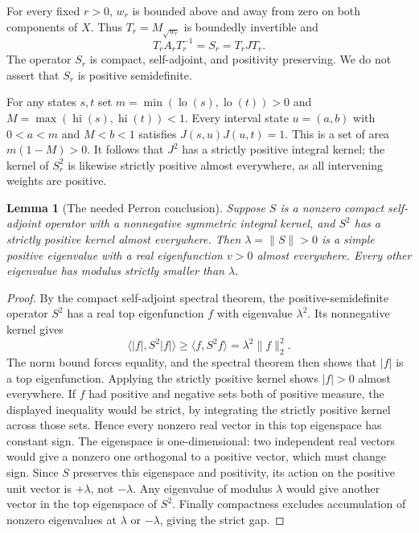 \documentclass[11pt,letterpaper]{article}
\numberwithin{equation}{section}
\newtheorem{lemma}[theorem]{Lemma}
\theoremstyle{remark}\newtheorem{remark}[theorem]{Remark}
\newcommand{\lo}{\operatorname{lo}}
\newcommand{\hi}{\operatorname{hi}}
\begin{document}
For every fixed $r>0$, $w_r$ is bounded above and away from zero on
both components of $X$. Thus $T_r=M_{\sqrt{w_r}}$ is boundedly
invertible and
\begin{equation}\label{psp:op:eq:similarity}
 T_rA_rT_r^{-1}=S_r=T_rJT_r.
\end{equation}
The operator $S_r$ is compact, self-adjoint, and positivity preserving.
We do not assert that $S_r$ is positive semidefinite.

For any states $s,t$ set
$m=\min(\lo(s),\lo(t))>0$ and
$M=\max(\hi(s),\hi(t))<1$. Every interval state
$u=(a,b)$ with $0<a<m$ and $M<b<1$ satisfies
$J(s,u)J(u,t)=1$. This is a set of area $m(1-M)>0$.
It follows that $J^2$ has a strictly positive integral kernel;
the kernel of $S_r^2$ is likewise strictly positive almost everywhere,
as all intervening weights are positive.

\begin{lemma}[The needed Perron conclusion]\label{psp:op:lem:perron}
Suppose $S$ is a nonzero compact self-adjoint operator with a
nonnegative symmetric integral kernel, and $S^2$ has a strictly
positive kernel almost everywhere. Then $\lambda=\|S\|>0$ is a simple
positive eigenvalue with a real eigenfunction $v>0$ almost everywhere.
Every other eigenvalue has modulus strictly smaller than $\lambda$.
\end{lemma}
\begin{proof}
By the compact self-adjoint spectral theorem, the positive-semidefinite
operator $S^2$ has a real top eigenfunction $f$ with eigenvalue
$\lambda^2$. Its nonnegative kernel gives
\[
 \langle |f|,S^2|f|\rangle\geq
 \langle f,S^2f\rangle=\lambda^2\|f\|_2^2.
\]
The norm bound forces equality, and the spectral theorem then shows
that $|f|$ is a top eigenfunction. Applying the strictly positive
kernel shows $|f|>0$ almost everywhere. If $f$ had positive and negative
sets both of positive measure, the displayed inequality would be
strict, by integrating the strictly positive kernel across those sets.
Hence every nonzero real vector in this top eigenspace has constant
sign. The eigenspace is one-dimensional: two independent real vectors
would give a nonzero one orthogonal to a positive vector, which must
change sign. Since $S$ preserves this eigenspace and positivity, its
action on the positive unit vector is $+\lambda$, not $-\lambda$.
Any eigenvalue of modulus $\lambda$ would give another vector in the
top eigenspace of $S^2$. Finally compactness excludes accumulation of
nonzero eigenvalues at $\lambda$ or $-\lambda$, giving the strict gap.
\end{proof}
\end{document}
